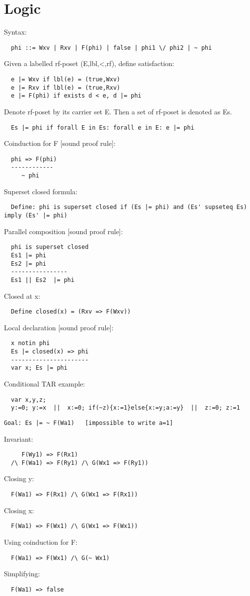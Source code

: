 \section{Logic}
\label{sec:logic}

Syntax:
\begin{verbatim}
  phi ::= Wxv | Rxv | F(phi) | false | phi1 \/ phi2 | ~ phi
\end{verbatim}
Given a labelled rf-poset (E,lbl,<,rf), define satisfaction:
\begin{verbatim}
  e |= Wxv if lbl(e) = (true,Wxv)
  e |= Rxv if lbl(e) = (true,Rxv)
  e |= F(phi) if exists d < e, d |= phi
\end{verbatim}
Denote rf-poset by its carrier set E.
Then a set of rf-poset is denoted as Es.
\begin{verbatim}
  Es |= phi if forall E in Es: forall e in E: e |= phi
\end{verbatim}
Coinduction for F [sound proof rule]:
\begin{verbatim}
  phi => F(phi)
  ------------
     ~ phi
\end{verbatim}
Superset closed formula:
\begin{verbatim}
  Define: phi is superset closed if (Es |= phi) and (Es' supseteq Es) imply (Es' |= phi)
\end{verbatim}
Parallel composition [sound proof rule]:
\begin{verbatim}
  phi is superset closed
  Es1 |= phi  
  Es2 |= phi
  ----------------
  Es1 || Es2  |= phi
\end{verbatim}
Closed at x:
\begin{verbatim}
  Define closed(x) = (Rxv => F(Wxv))
\end{verbatim}
Local declaration [sound proof rule]:
\begin{verbatim}
  x notin phi
  Es |= closed(x) => phi
  ----------------------
  var x; Es |= phi
\end{verbatim}
Conditional TAR example:
\begin{verbatim}
  var x,y,z;
  y:=0; y:=x  ||  x:=0; if(~z){x:=1}else{x:=y;a:=y}  ||  z:=0; z:=1
\end{verbatim}
\begin{verbatim}
Goal: Es |= ~ F(Wa1)   [impossible to write a=1]
\end{verbatim}
Invariant:
\begin{verbatim}
     F(Wy1) => F(Rx1)
  /\ F(Wa1) => F(Ry1) /\ G(Wx1 => F(Ry1))
\end{verbatim}
Closing y:
\begin{verbatim}
  F(Wa1) => F(Rx1) /\ G(Wx1 => F(Rx1))
\end{verbatim}
Closing x:
\begin{verbatim}
  F(Wa1) => F(Wx1) /\ G(Wx1 => F(Wx1))
\end{verbatim}
Using coinduction for F:  
\begin{verbatim}
  F(Wa1) => F(Wx1) /\ G(~ Wx1)
\end{verbatim}
Simplifying:  
\begin{verbatim}
  F(Wa1) => false
\end{verbatim}